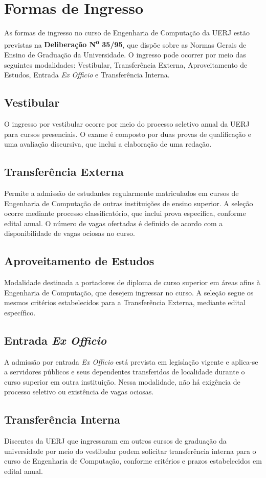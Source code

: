 \section{Formas de Ingresso}
\label{sec:forma-ingresso}

As formas de ingresso no curso de Engenharia de Computação da UERJ estão previstas na \textbf{Deliberação N\textsuperscript{o} 35/95}, que dispõe sobre as Normas Gerais de Ensino de Graduação da Universidade. O ingresso pode ocorrer por meio das seguintes modalidades: Vestibular, Transferência Externa, Aproveitamento de Estudos, Entrada \textit{Ex Officio} e Transferência Interna.

\subsection{Vestibular}
O ingresso por vestibular ocorre por meio do processo seletivo anual da UERJ para cursos presenciais. O exame é composto por duas provas de qualificação e uma avaliação discursiva, que inclui a elaboração de uma redação.

\subsection{Transferência Externa}
Permite a admissão de estudantes regularmente matriculados em cursos de Engenharia de Computação de outras instituições de ensino superior. A seleção ocorre mediante processo classificatório, que inclui prova específica, conforme edital anual. O número de vagas ofertadas é definido de acordo com a disponibilidade de vagas ociosas no curso.

\subsection{Aproveitamento de Estudos}
Modalidade destinada a portadores de diploma de curso superior em áreas afins à Engenharia de Computação, que desejem ingressar no curso. A seleção segue os mesmos critérios estabelecidos para a Transferência Externa, mediante edital específico.

\subsection{Entrada \textit{Ex Officio}}
A admissão por entrada \textit{Ex Officio} está prevista em legislação vigente e aplica-se a servidores públicos e seus dependentes transferidos de localidade durante o curso superior em outra instituição. Nessa modalidade, não há exigência de processo seletivo ou existência de vagas ociosas.

\subsection{Transferência Interna}
Discentes da UERJ que ingressaram em outros cursos de graduação da universidade por meio do vestibular podem solicitar transferência interna para o curso de Engenharia de Computação, conforme critérios e prazos estabelecidos em edital anual.





